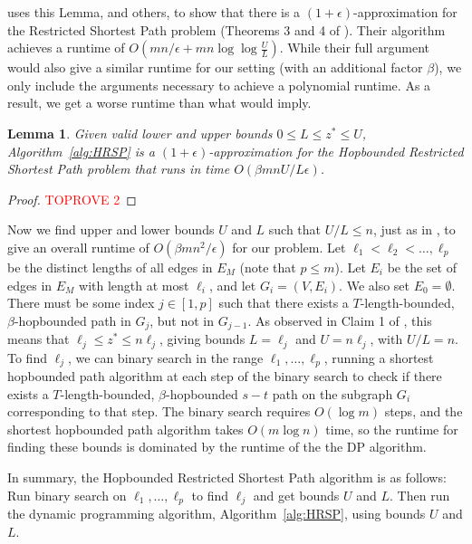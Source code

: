 \documentclass{article}
\newtheorem{lemma}[theorem]{Lemma}
\theoremstyle{definition}
\theoremstyle{remark}
\begin{document}
\cite{LR01} uses this Lemma, and others, to show that there is a $(1+\epsilon)$-approximation for the Restricted Shortest Path problem (Theorems 3 and 4 of \cite{LR01}). Their algorithm achieves a runtime of $O(m n/ \epsilon + m n \log \log \frac{U}{L})$. While their full argument would also give a similar runtime for our setting (with an additional factor $\beta$), we only include the arguments necessary to achieve a polynomial runtime. As a result, we get a worse runtime than what \cite{LR01} would imply. 

\begin{lemma} \label{lem:AS}
    Given valid lower and upper bounds $0 \leq L \leq z^* \leq U$, Algorithm~\ref{alg:HRSP} is a $(1+\epsilon)$-approximation for the Hopbounded Restricted Shortest Path problem that runs in time $O(\beta m n U / L \epsilon)$. 
\end{lemma}
\begin{proof}\textcolor{red}{TOPROVE 2}\end{proof}

Now we find upper and lower bounds $U$ and $L$ such that $U/L \leq n$, just as in \cite{LR01}, to give an overall runtime of $O(\beta m n^2 / \epsilon)$ for our problem. Let $\ell_1 < \ell_2 < \dots, \ell_p$ be the distinct lengths of all edges in $E_M$ (note that $p \leq m$). Let $E_i$ be the set of edges in $E_M$ with length at most $\ell_i$, and let $G_i = (V, E_i)$. We also set $E_0 = \emptyset$.
There must be some index $j \in [1,p]$ such that there exists a $T$-length-bounded, $\beta$-hopbounded path in $G_j$, but not in $G_{j-1}$. As observed in Claim 1 of \cite{LR01}, this means that $\ell_j \leq z^* \leq n \ell_j$, giving bounds $L = \ell_j$ and $U = n \ell_j$, with $U/L = n$. To find $\ell_j$, we can binary search in the range $\ell_1, \dots, \ell_p$, running a shortest hopbounded path algorithm at each step of the binary search to check if there exists a $T$-length-bounded, $\beta$-hopbounded $s-t$ path on the subgraph $G_i$ corresponding to that step. The binary search requires $O(\log m)$ steps, and the shortest hopbounded path algorithm takes $O(m \log n)$ time, so the runtime for finding these bounds is dominated by the runtime of the the DP algorithm. 

In summary, the Hopbounded Restricted Shortest Path algorithm is as follows: Run binary search on $\ell_1, \dots, \ell_p$ to find $\ell_j$ and get bounds $U$ and $L$. Then run the dynamic programming algorithm, Algorithm~\ref{alg:HRSP}, using bounds $U$ and $L$.
\else \fi
\end{document}
